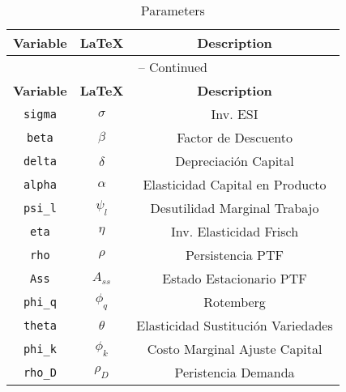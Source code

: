 \begin{center}
\begin{longtable}{ccc}
\caption{Parameters}\\%
\hline%
\multicolumn{1}{c}{\textbf{Variable}} &
\multicolumn{1}{c}{\textbf{\LaTeX}} &
\multicolumn{1}{c}{\textbf{Description}}\\%
\hline\hline%
\endfirsthead
\multicolumn{3}{c}{{\tablename} \thetable{} -- Continued}\\%
\hline%
\multicolumn{1}{c}{\textbf{Variable}} &
\multicolumn{1}{c}{\textbf{\LaTeX}} &
\multicolumn{1}{c}{\textbf{Description}}\\%
\hline\hline%
\endhead
\texttt{sigma} & $\sigma$ & Inv. ESI\\
\texttt{beta} & $\beta$ & Factor de Descuento\\
\texttt{delta} & $\delta$ & Depreciación Capital\\
\texttt{alpha} & $\alpha$ & Elasticidad Capital en Producto\\
\texttt{psi\_l} & $\psi_l$ & Desutilidad Marginal Trabajo\\
\texttt{eta} & $\eta$ & Inv. Elasticidad Frisch\\
\texttt{rho} & $\rho$ & Persistencia PTF\\
\texttt{Ass} & $A_{ss}$ & Estado Estacionario PTF\\
\texttt{phi\_q} & $\phi_q$ & Rotemberg\\
\texttt{theta} & $\theta$ & Elasticidad Sustitución Variedades\\
\texttt{phi\_k} & $\phi_k$ & Costo Marginal Ajuste Capital\\
\texttt{rho\_D} & $\rho_D$ & Peristencia Demanda\\
\hline%
\end{longtable}
\end{center}
